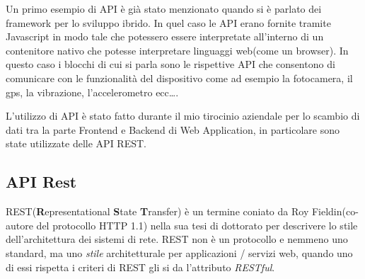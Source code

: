 Un primo esempio di API è già stato menzionato quando si è parlato dei framework per lo sviluppo ibrido. In quel caso le API erano fornite tramite Javascript in modo tale che potessero essere interpretate all'interno di un contenitore nativo che potesse interpretare linguaggi web(come un browser). In questo caso i blocchi di cui si parla sono le rispettive API che consentono di comunicare con le funzionalità del dispositivo come ad esempio la fotocamera, il gps, la vibrazione, l'accelerometro ecc\ldots.

L'utilizzo di API è stato fatto durante il mio tirocinio aziendale per lo scambio di dati tra la parte Frontend e Backend di Web Application, in particolare sono state utilizzate delle API REST.

\subsection{API Rest}

REST(\textbf{R}epresentational \textbf{S}tate \textbf{T}ransfer) è un termine coniato da Roy Fieldin(co-autore del protocollo HTTP 1.1) nella sua tesi di dottorato per descrivere lo stile dell'architettura dei sistemi di rete. REST non è un protocollo e nemmeno uno standard, ma uno \emph{stile} architetturale per applicazioni / servizi web, quando uno di essi rispetta i criteri di REST gli si da l'attributo \emph{RESTful}.

